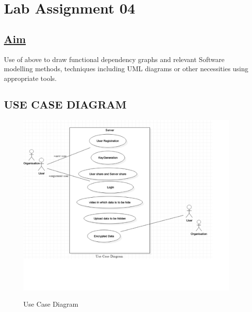  

\newpage
\section*{\centering\LARGE{Lab Assignment 04}}
\subsection*{\underline{Aim}}
Use of above to draw functional dependency graphs and relevant Software modelling methods, techniques including UML diagrams or other necessities using appropriate tools.
    \subsection*{USE CASE DIAGRAM}
    \begin{figure}[H]
    \centering
  \includegraphics[scale=0.25]{usecase.png}\\
  \caption{Use Case Diagram}
  
\end{figure}
    \pagebreak
